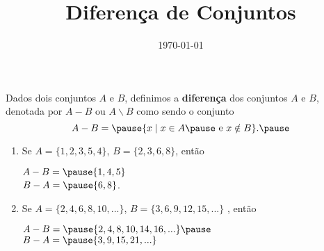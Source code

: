 \documentclass{beamer}
\title{Diferen\c{c}a de Conjuntos}
\author[\autor]{\autor}
\institute[\instituto]{\instituto}
\date{\today}
\begin{document}
    \begin{frame}
        \maketitle
    \end{frame}


    \begin{frame}
        \begin{definicao}
            Dados dois conjuntos $A$ e $B$, \pause definimos a \textbf{diferen{\c c}a} \pause dos conjuntos $A$ e $B$, denotada por \pause $A - B$ ou $A \backslash B$ \pause como sendo o conjunto\pause
            \[
                A - B = \pause \{x \mid x \in A \pause \mbox{ e } x \notin B\}.\pause
            \]
        \end{definicao}

        \begin{exemplos}
            \begin{enumerate}[label={\arabic*})]
                \item Se $A=\{1,2,3,5,4\}$, \pause $B=\{2,3,6,8\}$, \pause ent\~ao
                \begin{center}
                    $A - B = \pause \{1,4,5\}$\pause\\
                    $B - A = \pause \{6,8\}$.\pause
                \end{center}
                \item Se $A=\{2,4,6,8,10,...\}$, \pause $B=\{3,6,9,12,15,...\}$ \pause, ent\~ao\pause
                \begin{center}
                    $A - B = \pause \{2,4,8,10,14,16,...\}\pause$\\
                    $B - A = \pause \{3,9,15,21,...\}$
                 \end{center}
            \end{enumerate}
        \end{exemplos}
    \end{frame}
\end{document}
